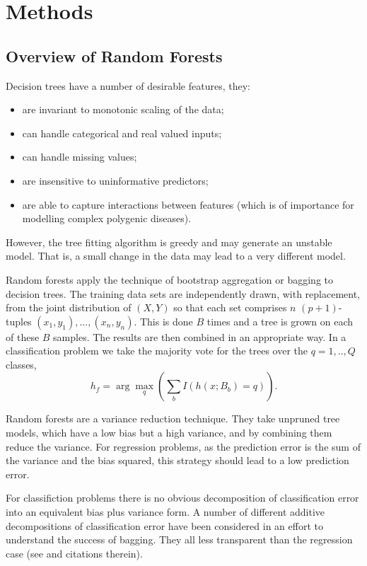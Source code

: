 \documentclass[10pt,letterpaper]{article}
\begin{document}
\section{Methods}
\label{section:methods}

\subsection{Overview of Random Forests}

Decision trees have a number of desirable features, they:
\begin{itemize}
  \item are invariant to monotonic scaling of the data;
  \item can handle categorical and real valued inputs;
  \item can handle missing values;
  \item are insensitive to uninformative predictors;
  \item are able to capture interactions between features (which is of importance for modelling complex polygenic diseases).
  \end{itemize}
However, the tree fitting algorithm is greedy and may generate an unstable model. That is, a small change in the data may
lead to a very different model. 

Random forests apply the technique of bootstrap aggregation or bagging to decision trees.  The training data sets are
independently drawn, with replacement, from the joint distribution of $(X,Y)$ so that each set comprises $n$
$(p+1)$-tuples $(x_1,y_1),\ldots, (x_n,y_n)$. This is done $B$ times and a tree is grown on each of these $B$ samples.
The results are then combined in an appropriate way. In a classification problem we take the majority vote for the trees
over the $q=1,..,Q$ classes,
\begin{equation*}
{{h_f}}= \arg \max_q \left(\sum_b I(h(x;B_b)=q)\right).
\end{equation*}

Random forests are a variance reduction technique. They take unpruned tree models, which have a low bias but a high
variance, and by combining them reduce the variance.  For regression problems, as the prediction error is the sum of the
variance and the bias squared, this strategy should lead to a low prediction error.

For classifiction problems there is no obvious decomposition of classification error into an equivalent bias plus
variance form. A number of different additive decompositions of classification error have been considered in an effort
to understand the success of bagging. They all less transparent than the regression case (see \cite{Friedman.1997} and
citations therein).
\end{document}
